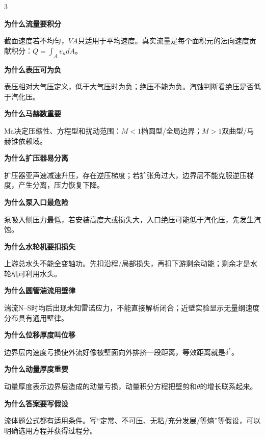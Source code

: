 \documentclass[a4paper]{article}
\newcommand{\qt}[1]{\vspace{0.25pt}\colorbox{Q}{\parbox{\dimexpr\linewidth-2\fboxsep}{\color{white}\bfseries #1}}\par}
\newcommand{\sect}[1]{\qt{#1}}
\begin{document}
\begin{multicols}{3}
{\sect{为什么流量要积分}
截面速度若不均匀，$VA$只适用于平均速度。真实流量是每个面积元的法向速度贡献积分：$Q=\int_A v_n dA$。
\sect{为什么表压可为负}
表压相对大气压定义，低于大气压时为负；绝压不能为负。汽蚀判断看绝压是否低于汽化压。
\sect{为什么马赫数重要}
Ma决定压缩性、方程型和扰动范围：$M<1$椭圆型/全局边界；$M>1$双曲型/马赫锥依赖域。
\sect{为什么扩压器易分离}
扩压器亚声速减速升压，存在逆压梯度；若扩张角过大，边界层不能克服逆压梯度，产生分离，压力恢复下降。
\sect{为什么泵入口最危险}
泵吸入侧压力最低，若安装高度大或损失大，入口绝压可能低于汽化压，先发生汽蚀。
\sect{为什么水轮机要扣损失}
上游总水头不能全变轴功。先扣沿程/局部损失，再扣下游剩余动能；剩余才是水轮机可利用水头。
\sect{为什么圆管湍流用壁律}
湍流N--S时均后出现未知雷诺应力，不能直接解析闭合；近壁实验显示无量纲速度分布具有通用壁律。
\sect{为什么位移厚度叫位移}
边界层内速度亏损使外流好像被壁面向外排挤一段距离，等效距离就是$\delta^*$。
\sect{为什么动量厚度重要}
动量厚度表示边界层造成的动量亏损，动量积分方程把壁剪和$\theta$的增长联系起来。
\sect{为什么答案要写假设}
流体题公式都有适用条件。写“定常、不可压、无粘/充分发展/等熵”等假设，可以明确选用方程并获得过程分。

}
\end{multicols}
\end{document}
